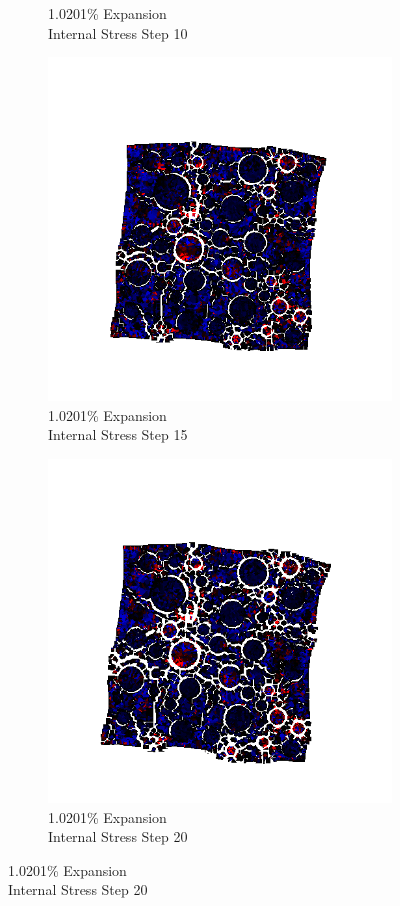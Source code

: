\begin{figure}[ht!]
\begin{subfigure}{.25\textwidth}
      \caption{1.0201\% Expansion\\Internal Stress Step 10}
    \end{subfigure}%
    \begin{subfigure}{.25\textwidth}
      \centering
      \includegraphics[width=1.0\linewidth]{Files/exp_3D/ASR/A30P25_4_s15.png}
      \caption{1.0201\% Expansion\\Internal Stress Step 15}
    \end{subfigure}%
    \begin{subfigure}{.25\textwidth}
      \centering
      \includegraphics[width=1.0\linewidth]{Files/exp_3D/ASR/A30P25_4_stress.png}
      \caption{1.0201\% Expansion\\Internal Stress Step 20}
    \end{subfigure}


\end{figure}
